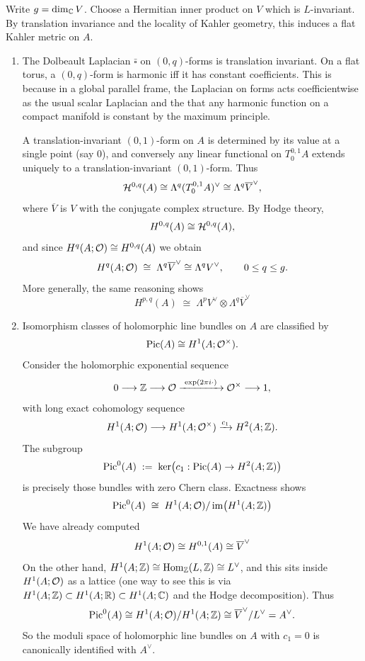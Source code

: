 \documentclass[12pt]{article}
\begin{document}
\begin{solution}
  Write $g=\dim_{\mathbb{C}} V$.  Choose a Hermitian inner product on $V$ which is
$L$-invariant. By translation invariance and the locality of Kahler
geometry, this induces a flat Kahler metric on $A$.  
  \begin{enumerate}
    \item The Dolbeault Laplacian $\bar\square$ on $(0,q)$-forms is translation invariant.  On a flat torus, a $(0,q)$-form is harmonic iff it
has constant coefficients. This is because in a global parallel frame, the Laplacian on forms acts coefficientwise as the usual scalar Laplacian and the that any harmonic function on a compact manifold is constant by the maximum principle.

A translation-invariant $(0,1)$-form on $A$ is determined by its value at a single point (say $0$), and conversely any linear functional on $T_0^{0,1}A$ extends uniquely to a translation-invariant $(0,1)$-form.
Thus
\[
{\mathcal{H}}^{0,q}(A)\cong \Lambda^q (T_0^{0,1}A)^\vee
\cong \Lambda^q \overline{V}^\vee,
\]
where $\overline{V}$ is $V$ with the conjugate complex structure.
By Hodge theory,
\[
H^{0,q}(A) \cong {\mathcal{H}}^{0,q}(A),
\]
and since $H^q(A;{\mathcal{O}}) \cong H^{0,q}(A)$ we obtain
\[
H^q(A;{\mathcal{O}}) \;\cong\; \Lambda^q\overline{V}^\vee \cong \Lambda^q V^\vee,
\qquad 0\le q\le g.
\]
More generally, the same reasoning shows
\[
H^{p,q}(A) \;\cong\; \Lambda^p V^\vee \otimes \Lambda^q\overline{V}^\vee
\]


\item Isomorphism classes of holomorphic line bundles on $A$ are classified by
\[
\operatorname{Pic}(A) \cong H^1(A;{\mathcal{O}}^\times).
\]
Consider the holomorphic exponential sequence
\[
0\longrightarrow \mathbb{Z} 
\longrightarrow {\mathcal{O}}
\xrightarrow{\ \exp(2\pi i\cdot)\ }
{\mathcal{O}}^\times
\longrightarrow 1,
\]
with long exact cohomology sequence
\[
H^1(A;{\mathcal{O}}) \longrightarrow H^1(A;{\mathcal{O}}^\times)
\xrightarrow{c_1} H^2(A;\mathbb{Z}).
\]
The subgroup
\[
\operatorname{Pic}^0(A)\;:=\;\ker\bigl(c_1:\operatorname{Pic}(A)\to H^2(A;\mathbb{Z})\bigr)
\]
is precisely those bundles with zero Chern class. Exactness shows
\[
\operatorname{Pic}^0(A) \;\cong\; H^1(A;{\mathcal{O}})/\operatorname{im}\bigl(H^1(A;\mathbb{Z})\bigr)
\]
We have already computed
\[
H^1(A;{\mathcal{O}})\cong H^{0,1}(A)\cong \overline{V}^\vee 
\]
On the other hand, $H^1(A;\mathbb{Z})\cong \operatorname{Hom}_{\mathbb{Z}}(L,\mathbb{Z})\cong L^\vee$, and this
sits inside $H^1(A;{\mathcal{O}})$ as a lattice (one way to see this is via
$H^1(A;\mathbb{Z})\subset H^1(A;\mathbb{R})\subset H^1(A;\mathbb{C})$ and the Hodge decomposition).
Thus
\[
\operatorname{Pic}^0(A)
\cong 
H^1(A;{\mathcal{O}})/H^1(A;\mathbb{Z})
\cong
\overline{V}^\vee / L^\vee
=
A^\vee.
\]
So the moduli space of holomorphic line bundles on $A$ with $c_1=0$ is
canonically identified with $A^\vee$.


\end{enumerate}
\end{solution}
\end{document}
